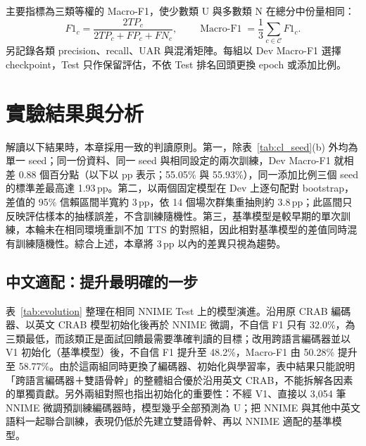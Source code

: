 主要指標為三類等權的 Macro-F1，使少數類 U 與多數類 N 在總分中份量相同：
\begin{equation}
 F1_c=\frac{2TP_c}{2TP_c+FP_c+FN_c},\qquad
 \operatorname{Macro\text{-}F1}=\frac{1}{3}\sum_{c\in\mathcal C}F1_c .
 \label{eq:macrof1}
\end{equation}
另記錄各類 precision、recall、UAR 與混淆矩陣。每組以 Dev Macro-F1 選擇 checkpoint，Test 只作保留評估，不依 Test 排名回頭更換 epoch 或添加比例。

\FloatBarrier
\section{實驗結果與分析}
\label{sec:results}

解讀以下結果時，本章採用一致的判讀原則。第一，除表~\ref{tab:cl_seed}(b) 外均為單一 seed；同一份資料、同一 seed 與相同設定的兩次訓練，Dev Macro-F1 就相差 0.88 個百分點（以下以 pp 表示；55.05\% 與 55.93\%），同一添加比例三個 seed 的標準差最高達 1.93\,pp。第二，以兩個固定模型在 Dev 上逐句配對 bootstrap，差值的 95\% 信賴區間半寬約 3\,pp，依 14 個場次群集重抽則約 3.8\,pp；此區間只反映評估樣本的抽樣誤差，不含訓練隨機性。第三，基準模型是較早期的單次訓練，本輪未在相同環境重訓不加 TTS 的對照組，因此相對基準模型的差值同時混有訓練隨機性。綜合上述，本章將 3\,pp 以內的差異只視為趨勢。

\subsection{中文適配：提升最明確的一步}
\label{sec:res_adapt}

表~\ref{tab:evolution} 整理在相同 NNIME Test 上的模型演進。沿用原 CRAB 編碼器、以英文 CRAB 模型初始化後再於 NNIME 微調，不自信 F1 只有 32.0\%，為三類最低，而該類正是面試回饋最需要準確判讀的目標；改用跨語言編碼器並以 V1 初始化（基準模型）後，不自信 F1 提升至 48.2\%，Macro-F1 由 50.28\% 提升至 58.77\%。由於這兩組同時更換了編碼器、初始化與學習率，表中結果只能說明「跨語言編碼器＋雙語骨幹」的整體組合優於沿用英文 CRAB，不能拆解各因素的單獨貢獻。另外兩組對照也指出初始化的重要性：不經 V1、直接以 3,054 筆 NNIME 微調預訓練編碼器時，模型幾乎全部預測為 U；把 NNIME 與其他中英文語料一起聯合訓練，表現仍低於先建立雙語骨幹、再以 NNIME 適配的基準模型。

